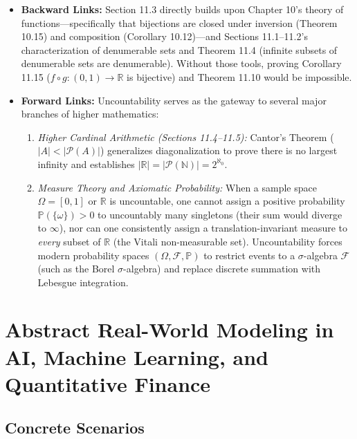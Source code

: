 \documentclass[11pt, letterpaper]{article}
\theoremstyle{definition}
\theoremstyle{remark}
\begin{document}
\begin{itemize}
    \item \textbf{Backward Links:} Section 11.3 directly builds upon Chapter 10's theory of functions—specifically that bijections are closed under inversion (Theorem 10.15) and composition (Corollary 10.12)—and Sections 11.1--11.2's characterization of denumerable sets and Theorem 11.4 (infinite subsets of denumerable sets are denumerable). Without those tools, proving Corollary 11.15 ($f \circ g : (0, 1) \to \mathbb{R}$ is bijective) and Theorem 11.10 would be impossible.
    \item \textbf{Forward Links:} Uncountability serves as the gateway to several major branches of higher mathematics:
    \begin{enumerate}[label=(\alph*)]
        \item \emph{Higher Cardinal Arithmetic (Sections 11.4--11.5):} Cantor's Theorem ($|A| < |\mathcal{P}(A)|$) generalizes diagonalization to prove there is no largest infinity and establishes $|\mathbb{R}| = |\mathcal{P}(\mathbb{N})| = 2^{\aleph_0}$.
        \item \emph{Measure Theory and Axiomatic Probability:} When a sample space $\Omega = [0, 1]$ or $\mathbb{R}$ is uncountable, one cannot assign a positive probability $\mathbb{P}(\{\omega\}) > 0$ to uncountably many singletons (their sum would diverge to $\infty$), nor can one consistently assign a translation-invariant measure to \emph{every} subset of $\mathbb{R}$ (the Vitali non-measurable set). Uncountability forces modern probability spaces $(\Omega, \mathcal{F}, \mathbb{P})$ to restrict events to a $\sigma$-algebra $\mathcal{F}$ (such as the Borel $\sigma$-algebra) and replace discrete summation with Lebesgue integration.
    \end{enumerate}
\end{itemize}

\section{Abstract Real-World Modeling in AI, Machine Learning, and Quantitative Finance}

\subsection{Concrete Scenarios}
\end{document}
